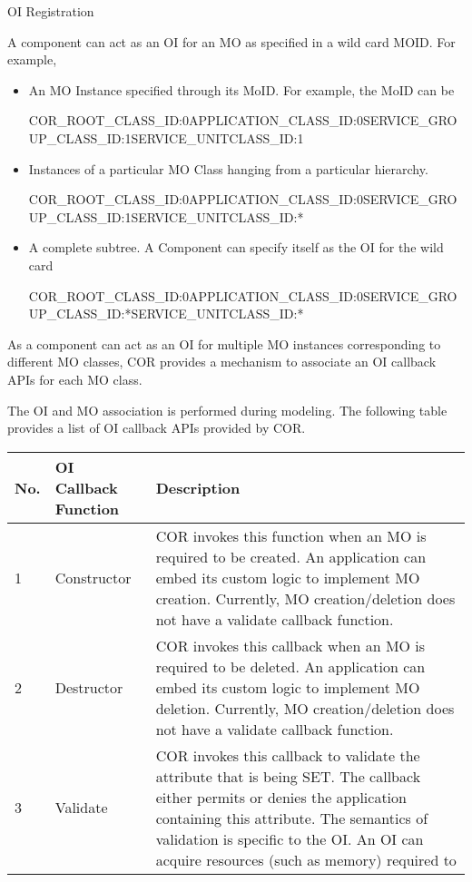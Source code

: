\begin{flushleft}
\begin{Desc}
\item
[OI Registration]\end{Desc}
A component can act as an OI for an MO as specified in a wild card MOID. For example,
\begin{itemize}
\item
An MO Instance specified through its MoID. For example, the MoID can be 
\par
COR\_\-ROOT\_\-CLASS\_\-ID:0\/APPLICATION\_\-CLASS\_\-ID:0\/SERVICE\_\-GROUP\_\-CLASS\_\-ID:1\/SERVICE\_\-UNITCLASS\_\-ID:1\/
\item
Instances of a particular MO Class hanging from a particular hierarchy. 
\par
COR\_\-ROOT\_\-CLASS\_\-ID:0\/APPLICATION\_\-CLASS\_\-ID:0\/SERVICE\_\-GROUP\_\-CLASS\_\-ID:1\/SERVICE\_\-UNITCLASS\_\-ID:*
\item
A complete subtree. A Component can specify itself as the OI for the wild card
\par
COR\_\-ROOT\_\-CLASS\_\-ID:0\/APPLICATION\_\-CLASS\_\-ID:0\/SERVICE\_\-GROUP\_\-CLASS\_\-ID:*\/SERVICE\_\-UNITCLASS\_\-ID:*
\end{itemize}
As a component can act as an OI for multiple MO instances corresponding to different MO classes, COR provides a mechanism to associate an OI callback 
APIs for each MO class.
\par
The OI and MO association is performed during modeling. The following table provides a list of OI callback APIs provided by COR.
\begin{tabular}{|l|l|p{4in}|}
\hline
 {\bf No.} & {\bf OI Callback Function} & {\bf Description} \\
\hline
         1 & Constructor & COR invokes this function when an MO is required to be created.  An application can embed its custom logic to implement
         MO creation. Currently, MO creation/deletion does not have a validate callback function. \\
\hline
         2 & Destructor & COR invokes this callback when an MO is required to be deleted.  An application can embed its custom logic to implement MO
         deletion. Currently, MO creation/deletion does not have a validate callback function. \\
\hline
         3 & Validate & COR invokes this callback to validate the attribute that is being SET. The callback either permits or denies the application 
         containing this attribute. The semantics of validation is specific to the OI. An OI can acquire resources (such as memory) required to

\end{tabular}
\end{flushleft}
